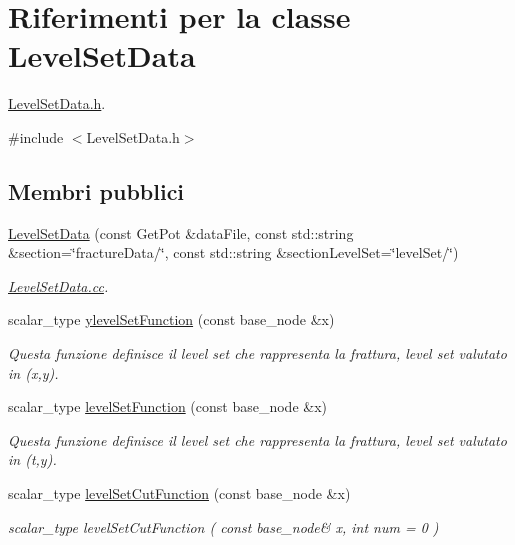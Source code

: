 \hypertarget{classLevelSetData}{\section{Riferimenti per la classe Level\-Set\-Data}
\label{classLevelSetData}
}


\hyperlink{LevelSetData_8h}{Level\-Set\-Data.\-h}.  




{\ttfamily \#include $<$Level\-Set\-Data.\-h$>$}

\subsection*{Membri pubblici}
\begin{DoxyCompactItemize}
\item 
\hyperlink{classLevelSetData_a8b2ab7808f47d9a951327891d65e84be}{Level\-Set\-Data} (const Get\-Pot \&data\-File, const std\-::string \&section=\char`\"{}fracture\-Data/\char`\"{}, const std\-::string \&section\-Level\-Set=\char`\"{}level\-Set/\char`\"{})
\begin{DoxyCompactList}\small\item\em \hyperlink{LevelSetData_8cc}{Level\-Set\-Data.\-cc}. \end{DoxyCompactList}\item 
scalar\-\_\-type \hyperlink{classLevelSetData_a732ae59581206d4f94237e54bc0071e3}{ylevel\-Set\-Function} (const base\-\_\-node \&x)
\begin{DoxyCompactList}\small\item\em Questa funzione definisce il level set che rappresenta la frattura, level set valutato in (x,y). \end{DoxyCompactList}\item 
scalar\-\_\-type \hyperlink{classLevelSetData_a665241939c12bad26face4d997e655ce}{level\-Set\-Function} (const base\-\_\-node \&x)
\begin{DoxyCompactList}\small\item\em Questa funzione definisce il level set che rappresenta la frattura, level set valutato in (t,y). \end{DoxyCompactList}\item 
scalar\-\_\-type \hyperlink{classLevelSetData_a60ea6aa9991dfdae4e4a3950ed8db66c}{level\-Set\-Cut\-Function} (const base\-\_\-node \&x)
\begin{DoxyCompactList}\small\item\em scalar\-\_\-type level\-Set\-Cut\-Function ( const base\-\_\-node\& x, int num = 0 ) \end{DoxyCompactList}\item 

\end{DoxyCompactItemize}
